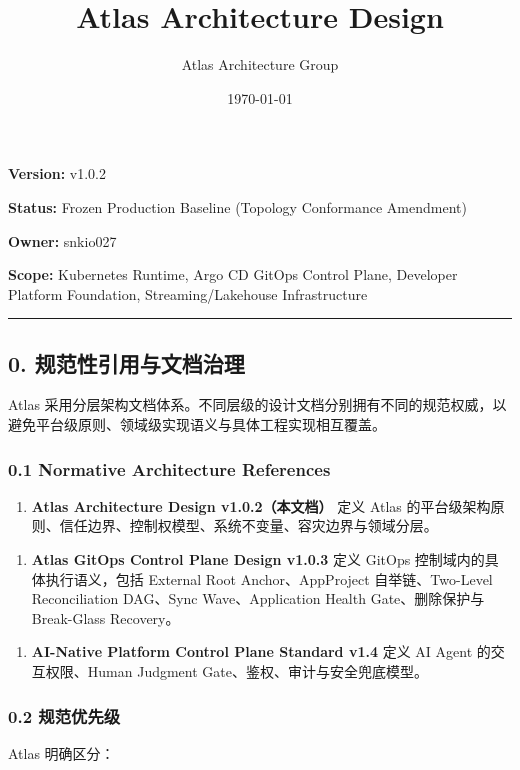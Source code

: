 \documentclass[11pt,a4paper]{article}
\title{\textbf{\Large Atlas Architecture Design}}
\author{Atlas Architecture Group}
\date{\today}
\begin{document}
\maketitle
\tableofcontents
\newpage

\textbf{Version:} v1.0.2

\textbf{Status:} Frozen Production Baseline (Topology Conformance Amendment)

\textbf{Owner:} snkio027

\textbf{Scope:} Kubernetes Runtime, Argo CD GitOps Control Plane, Developer Platform Foundation, Streaming/Lakehouse Infrastructure

\vspace{0.5em}\hrule\vspace{0.5em}
\subsection{0. 规范性引用与文档治理}
Atlas 采用分层架构文档体系。不同层级的设计文档分别拥有不同的规范权威，以避免平台级原则、领域级实现语义与具体工程实现相互覆盖。

\subsubsection{0.1 Normative Architecture References}
\begin{enumerate}
  \item \textbf{Atlas Architecture Design v1.0.2（本文档）}
定义 Atlas 的平台级架构原则、信任边界、控制权模型、系统不变量、容灾边界与领域分层。

\end{enumerate}
\begin{enumerate}
  \item \textbf{Atlas GitOps Control Plane Design v1.0.3}
定义 GitOps 控制域内的具体执行语义，包括 External Root Anchor、AppProject 自举链、Two-Level Reconciliation DAG、Sync Wave、Application Health Gate、删除保护与 Break-Glass Recovery。

\end{enumerate}
\begin{enumerate}
  \item \textbf{AI-Native Platform Control Plane Standard v1.4}
定义 AI Agent 的交互权限、Human Judgment Gate、鉴权、审计与安全兜底模型。

\end{enumerate}
\subsubsection{0.2 规范优先级}
Atlas 明确区分：
\end{document}
